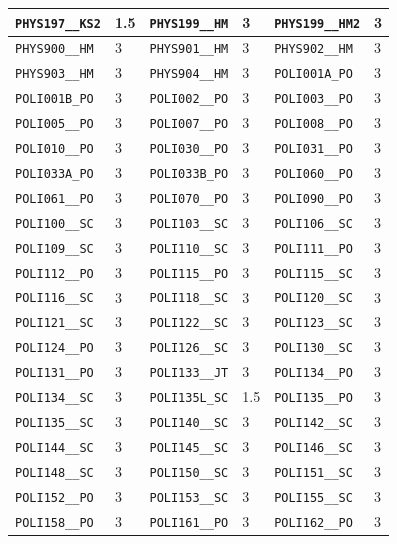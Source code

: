 \begin{longtable}{|l|l||l|l||l|l|}
    \verb|PHYS197__KS2| & 1.5 & \verb|PHYS199__HM| & 3 & \verb|PHYS199__HM2| & 3\\\hline
    \verb|PHYS900__HM| & 3 & \verb|PHYS901__HM| & 3 & \verb|PHYS902__HM| & 3\\\hline
    \verb|PHYS903__HM| & 3 & \verb|PHYS904__HM| & 3 & \verb|POLI001A_PO| & 3\\\hline
    \verb|POLI001B_PO| & 3 & \verb|POLI002__PO| & 3 & \verb|POLI003__PO| & 3\\\hline
    \verb|POLI005__PO| & 3 & \verb|POLI007__PO| & 3 & \verb|POLI008__PO| & 3\\\hline
    \verb|POLI010__PO| & 3 & \verb|POLI030__PO| & 3 & \verb|POLI031__PO| & 3\\\hline
    \verb|POLI033A_PO| & 3 & \verb|POLI033B_PO| & 3 & \verb|POLI060__PO| & 3\\\hline
    \verb|POLI061__PO| & 3 & \verb|POLI070__PO| & 3 & \verb|POLI090__PO| & 3\\\hline
    \verb|POLI100__SC| & 3 & \verb|POLI103__SC| & 3 & \verb|POLI106__SC| & 3\\\hline
    \verb|POLI109__SC| & 3 & \verb|POLI110__SC| & 3 & \verb|POLI111__PO| & 3\\\hline
    \verb|POLI112__PO| & 3 & \verb|POLI115__PO| & 3 & \verb|POLI115__SC| & 3\\\hline
    \verb|POLI116__SC| & 3 & \verb|POLI118__SC| & 3 & \verb|POLI120__SC| & 3\\\hline
    \verb|POLI121__SC| & 3 & \verb|POLI122__SC| & 3 & \verb|POLI123__SC| & 3\\\hline
    \verb|POLI124__PO| & 3 & \verb|POLI126__SC| & 3 & \verb|POLI130__SC| & 3\\\hline
    \verb|POLI131__PO| & 3 & \verb|POLI133__JT| & 3 & \verb|POLI134__PO| & 3\\\hline
    \verb|POLI134__SC| & 3 & \verb|POLI135L_SC| & 1.5 & \verb|POLI135__PO| & 3\\\hline
    \verb|POLI135__SC| & 3 & \verb|POLI140__SC| & 3 & \verb|POLI142__SC| & 3\\\hline
    \verb|POLI144__SC| & 3 & \verb|POLI145__SC| & 3 & \verb|POLI146__SC| & 3\\\hline
    \verb|POLI148__SC| & 3 & \verb|POLI150__SC| & 3 & \verb|POLI151__SC| & 3\\\hline
    \verb|POLI152__PO| & 3 & \verb|POLI153__SC| & 3 & \verb|POLI155__SC| & 3\\\hline
    \verb|POLI158__PO| & 3 & \verb|POLI161__PO| & 3 & \verb|POLI162__PO| & 3\\\hline

\end{longtable}
